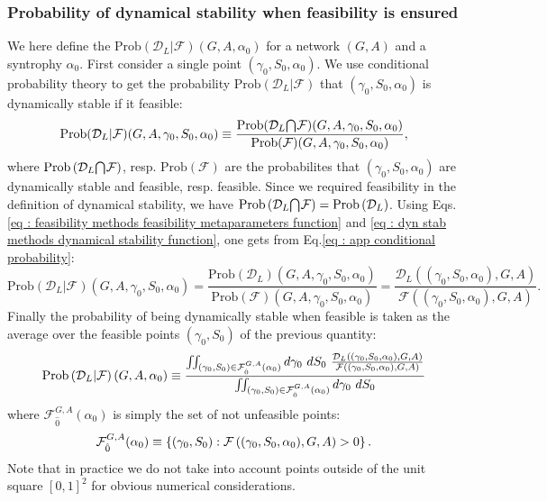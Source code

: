 \documentclass[12pt, titlepage, twoside, openright]{report}
\begin{document}
\subsubsection{Probability of dynamical stability when feasibility is ensured}\label{app : probability of being dynamically stable when feasible}
We here define the  $\text{Prob}\left(\mathcal{D}_L | \mathcal{F}\right)(G,A, \alpha_0)$ for a network $(G,A)$ and a syntrophy $\alpha_0$. First consider a single point $(\gamma_0, S_0, \alpha_0)$. We use conditional probability theory \cite{kolmogorov_foundations_1960} to get the probability $\text{Prob}(\mathcal{D}_L | \mathcal{F})$ that $(\gamma_0, S_0, \alpha_0)$ is dynamically stable if it feasible:
\begin{equation}
\text{Prob}(\mathcal{D}_L | \mathcal{F})(G, A, \gamma_0, S_0, \alpha_0) \equiv \frac{\text{Prob}(\mathcal{D}_L {\bigcap}_{} \mathcal{F})(G, A, \gamma_0, S_0, \alpha_0)}{\text{Prob}(\mathcal{F})(G, A, \gamma_0, S_0, \alpha_0)}, \label{eq : app conditional probability}
\end{equation}
where $\text{Prob}\left(\mathcal{D}_L {\bigcap}_{} \mathcal{F}\right)$, resp. $\text{Prob}\left(\mathcal{F}\right)$ are the probabilites that $(\gamma_0, S_0, \alpha_0)$ are dynamically stable and feasible, resp. feasible. Since we required feasibility in the definition of dynamical stability, we have $\text{Prob}\left(\mathcal{D}_L {\bigcap}_{} \mathcal{F}\right)=\text{Prob}\left(\mathcal{D}_L\right)$. Using Eqs.\eqref{eq : feasibility methods feasibility metaparameters function} and \eqref{eq : dyn stab methods dynamical stability function}, one gets from Eq.\eqref{eq : app conditional probability}:
\begin{equation}
\text{Prob}(\mathcal{D}_L | \mathcal{F})(G, A, \gamma_0, S_0, \alpha_0) = \frac{\text{Prob}(\mathcal{D}_L)(G, A, \gamma_0, S_0, \alpha_0)}{\text{Prob}(\mathcal{F})(G, A, \gamma_0, S_0, \alpha_0)} = \frac{\mathcal{D}_L\left((\gamma_0, S_0, \alpha_0), G, A\right)}{\mathcal{F}\left((\gamma_0, S_0, \alpha_0), G, A\right)}.
\end{equation}
Finally the probability of being dynamically stable when feasible is taken as the average over the feasible points $(\gamma_0, S_0)$ of the previous quantity:
\begin{equation}
\text{Prob}\left(\mathcal{D}_L | \mathcal{F}\right)(G, A, \alpha_0) \defined \frac{\iint_{(\gamma_0, S_0) \in \mathcal{F}^{G,A}_{\hat{0}}(\alpha_0)}d\gamma_0 \ dS_0 \ \frac{\mathcal{D}_L\left((\gamma_0, S_0, \alpha_0), G, A\right)}{\mathcal{F}\left((\gamma_0, S_0, \alpha_0), G, A\right)}}{\iint_{(\gamma_0, S_0) \in \mathcal{F}^{G,A}_{\hat{0}}(\alpha_0)}d\gamma_0 \ dS_0 }
\end{equation}
where $\mathcal{F}^{G,A}_{\hat{0}}(\alpha_0)$ is simply the set of not unfeasible points:
\begin{equation}
\mathcal{F}^{G,A}_{\hat{0}}(\alpha_0) \equiv \left\{(\gamma_0, S_0) : \mathcal{F}\left((\gamma_0, S_0, \alpha_0), G, A\right) > 0\right\}.
\end{equation}
Note that in practice we do not take into account points outside of the unit square $[0,1]^2$ for obvious numerical considerations.
\end{document}
